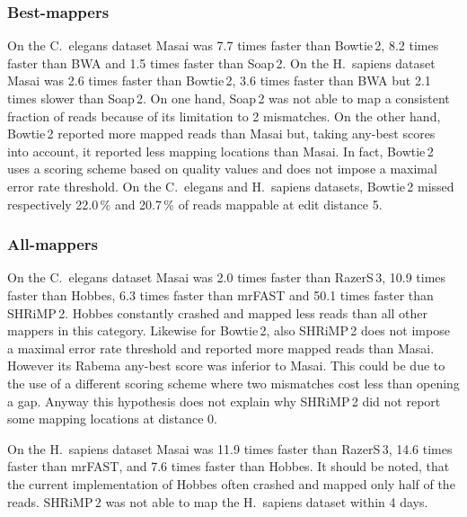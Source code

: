 \subsubsection{Best-mappers}
On the C.~elegans dataset Masai was 7.7 times faster than Bowtie\,2, 8.2 times faster than BWA and 1.5 times faster than Soap\,2.
On the H.~sapiens dataset Masai was 2.6 times faster than Bowtie\,2, 3.6 times faster than BWA but 2.1 times slower than Soap\,2.
On one hand, Soap\,2 was not able to map a consistent fraction of reads because of its limitation to 2 mismatches.
On the other hand, Bowtie\,2 reported more mapped reads than Masai but, taking any-best scores into account, it reported less mapping locations than Masai.
In fact, Bowtie\,2 uses a scoring scheme based on quality values and does not impose a maximal error rate threshold.
On the C.~elegans and H.~sapiens datasets, Bowtie\,2 missed respectively 22.0\,\% and 20.7\,\% of reads mappable at edit distance 5.


\subsubsection{All-mappers}
On the C.~elegans dataset Masai was 2.0 times faster than RazerS\,3, 10.9 times faster than Hobbes, 6.3 times faster than mrFAST and 50.1 times faster than SHRiMP\,2.
Hobbes constantly crashed and mapped less reads than all other mappers in this category.
Likewise for Bowtie\,2, also SHRiMP\,2 does not impose a maximal error rate threshold and reported more mapped reads than Masai.
However its Rabema any-best score was inferior to Masai.
This could be due to the use of a different scoring scheme where two mismatches cost less than opening a gap.
Anyway this hypothesis does not explain why SHRiMP\,2 did not report some mapping locations at distance 0.

On the H.~sapiens dataset Masai was 11.9 times faster than RazerS\,3, 14.6 times faster than mrFAST, and 7.6 times faster than Hobbes. It  should be noted, that the current implementation of Hobbes often crashed and mapped only half of the reads.
SHRiMP\,2 was not able to map the H.~sapiens dataset within 4 days.

